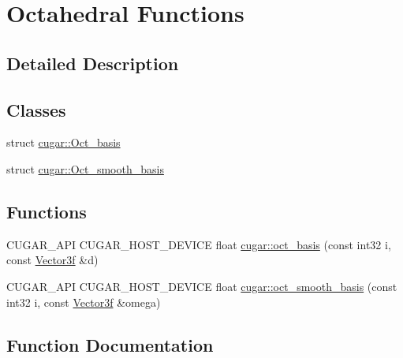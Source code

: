 \hypertarget{group__octahedral__functions}{}\section{Octahedral Functions}
\label{group__octahedral__functions}


\subsection{Detailed Description}
\subsection*{Classes}
\begin{DoxyCompactItemize}
\item 
struct \hyperlink{structcugar_1_1_oct__basis}{cugar\+::\+Oct\+\_\+basis}
\item 
struct \hyperlink{structcugar_1_1_oct__smooth__basis}{cugar\+::\+Oct\+\_\+smooth\+\_\+basis}
\end{DoxyCompactItemize}
\subsection*{Functions}
\begin{DoxyCompactItemize}
\item 
C\+U\+G\+A\+R\+\_\+\+A\+PI C\+U\+G\+A\+R\+\_\+\+H\+O\+S\+T\+\_\+\+D\+E\+V\+I\+CE float \hyperlink{group__octahedral__functions_gab5a718bf9c2f681d6ee998cdc429f5ef}{cugar\+::oct\+\_\+basis} (const int32 i, const \hyperlink{structcugar_1_1_vector}{Vector3f} \&d)
\item 
C\+U\+G\+A\+R\+\_\+\+A\+PI C\+U\+G\+A\+R\+\_\+\+H\+O\+S\+T\+\_\+\+D\+E\+V\+I\+CE float \hyperlink{group__octahedral__functions_ga71566a5a9606f7c37b4b04c9b6c8bac5}{cugar\+::oct\+\_\+smooth\+\_\+basis} (const int32 i, const \hyperlink{structcugar_1_1_vector}{Vector3f} \&omega)
\end{DoxyCompactItemize}


\subsection{Function Documentation}
\mbox{\label{group__octahedral__functions_gab5a718bf9c2f681d6ee998cdc429f5ef}} 
